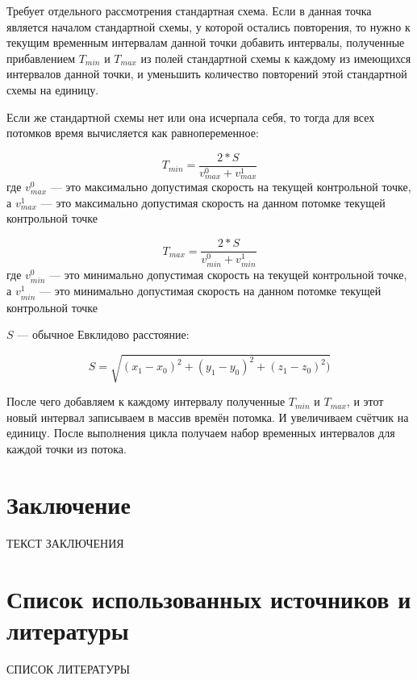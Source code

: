 \documentclass[12pt, a4 paper]{article}
\theoremstyle{plain}
\begin{document}
Требует отдельного рассмотрения стандартная схема. Если в данная точка является началом стандартной схемы, у которой остались повторения, то нужно к текущим временным интервалам данной точки добавить интервалы, полученные прибавлением $T_{min}$ и $T_{max}$ из полей стандартной схемы к каждому из имеющихся интервалов данной точки, и уменьшить количество повторений этой стандартной схемы на единицу. 

Если же стандартной схемы нет или она исчерпала себя, то тогда для всех потомков время вычисляется как равнопеременное:

$$
T_{min} = \frac{2 \ast S}{v_{max}^0 + v_{max}^1}
$$
где $v_{max}^0$ --- это максимально допустимая скорость на текущей контрольной точке, а $v_{max}^1$ --- это максимально допустимая скорость на данном потомке текущей контрольной точке

$$
T_{max} = \frac{2 \ast S}{v_{min}^0 + v_{min}^1}
$$
где $v_{min}^0$ --- это минимально допустимая скорость на текущей контрольной точке, а $v_{min}^1$ --- это минимально допустимая скорость на данном потомке текущей контрольной точке

$S$ --- обычное Евклидово расстояние:

$$
S = \sqrt{(x_1 - x_0)^2 + (y_1 - y_0)^2 + (z_1 - z_0)^2)}
$$


После чего добавляем к каждому интервалу полученные $T_{min}$ и $T_{max}$, и этот новый интервал записываем в массив времён потомка. И увеличиваем счётчик на единицу. После выполнения цикла получаем набор временных интервалов для каждой точки из потока.

\newpage

\section*{Заключение}

ТЕКСТ ЗАКЛЮЧЕНИЯ

\newpage

\section*{Список использованных источников и литературы}

СПИСОК ЛИТЕРАТУРЫ
\end{document}
